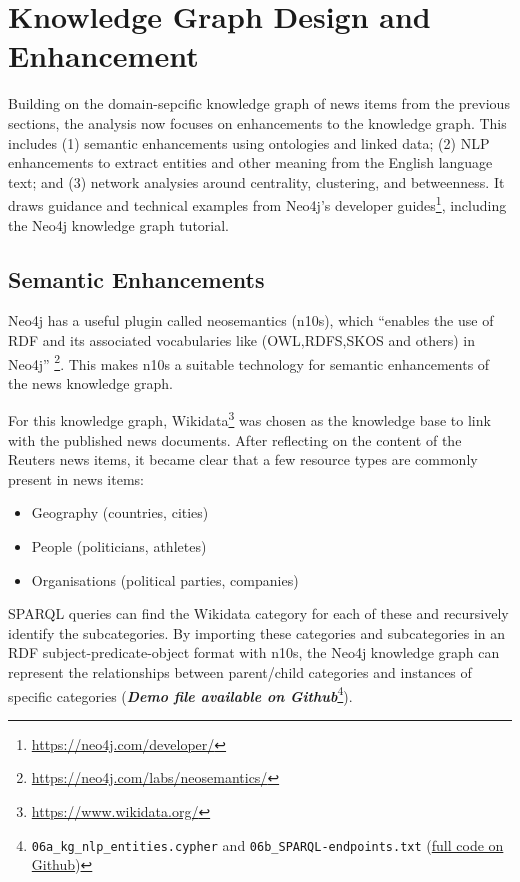 \documentclass[11pt]{article}
\begin{document}
\section{Knowledge Graph Design and Enhancement}

Building on the domain-sepcific knowledge graph of news items from the previous sections, the analysis now focuses on enhancements to the knowledge graph. This includes (1) semantic enhancements using ontologies and linked data; (2) NLP enhancements to extract entities and other meaning from the English language text; and (3) network analysies around centrality, clustering, and betweenness. It draws guidance and technical examples from Neo4j's developer guides\footnote{\url{https://neo4j.com/developer/}}, including the Neo4j knowledge graph tutorial\cite{neo4j-kg-tutorial}.

  \subsection{Semantic Enhancements}

  Neo4j has a useful plugin called neosemantics (n10s), which ``enables the use of RDF and its associated vocabularies like (OWL,RDFS,SKOS and others) in Neo4j'' \footnote{\url{https://neo4j.com/labs/neosemantics/}}. This makes n10s a suitable technology for semantic enhancements of the news knowledge graph.

  For this knowledge graph, Wikidata\footnote{\url{https://www.wikidata.org/}} was chosen as the knowledge base to link with the published news documents. After reflecting on the content of the Reuters news items, it became clear that a few resource types are commonly present in news items:
  \begin{itemize}
    \item{Geography (countries, cities)}
    \item{People (politicians, athletes)}
    \item{Organisations (political parties, companies)}
  \end{itemize}

  SPARQL queries can find the Wikidata category for each of these and recursively identify the subcategories. By importing these categories and subcategories in an RDF subject-predicate-object format with n10s, the Neo4j knowledge graph can represent the relationships between parent/child categories and instances of specific categories (\textit{\textbf{Demo file available on Github}}\footnote{\lstinline{06a_kg_nlp_entities.cypher} and \lstinline{06b_SPARQL-endpoints.txt} (\href{https://github.com/Birkbeck/msc-data-science-project-2020_21---files-heychrisek/}{full code on Github})}).
\end{document}
